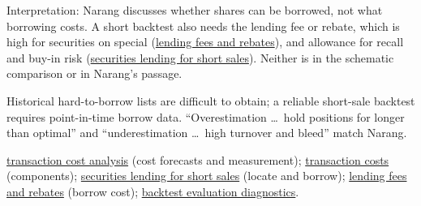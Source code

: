 \begin{qfpitfall}
 Interpretation: Narang discusses whether shares can be borrowed, not what borrowing costs. A short backtest also needs the lending fee or rebate, which is high for securities on special (\hyperref[def:securities-lending-fee-rebate]{lending fees and rebates}), and allowance for recall and buy-in risk (\hyperref[mech:securities-lending-short-sale]{securities lending for short sales}). Neither is in the schematic comparison or in Narang's passage.

 Historical hard-to-borrow lists are difficult to obtain; a reliable short-sale backtest requires point-in-time borrow data. ``Overestimation \dots\ hold positions for longer than optimal'' and ``underestimation \dots\ high turnover and bleed'' match Narang.

 \hyperref[meth:transaction-cost-analysis]{transaction cost analysis} (cost forecasts and measurement); \hyperref[def:transaction-costs]{transaction costs} (components); \hyperref[mech:securities-lending-short-sale]{securities lending for short sales} (locate and borrow); \hyperref[def:securities-lending-fee-rebate]{lending fees and rebates} (borrow cost); \hyperref[meth:backtest-evaluation-diagnostics]{backtest evaluation diagnostics}.

\end{qfpitfall}

